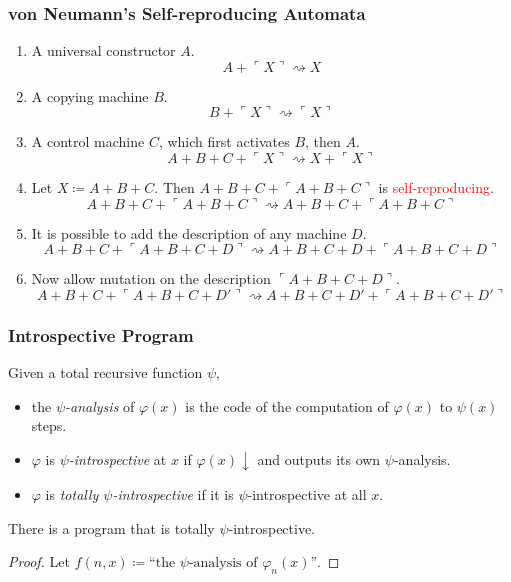 \documentclass[UTF8,11pt,colorlinks,compress,openany]{beamer}%
\begin{document}
\begin{frame}\frametitle{von Neumann's Self-reproducing Automata}
	\begin{enumerate}
		\item A universal constructor $A$.
		\[A+\ulcorner X\urcorner\rightsquigarrow X\]
		\item A copying machine $B$.
		\[B+\ulcorner X\urcorner\rightsquigarrow\ulcorner X\urcorner\]
		\item A control machine $C$, which first activates $B$, then $A$.
		\[A+B+C+\ulcorner X\urcorner\rightsquigarrow X+\ulcorner X\urcorner\]
		\item Let $X\coloneqq A+B+C$. {Then} $A+B+C+\ulcorner A+B+C\urcorner$ is \textcolor{red}{self-reproducing}.
		\[A+B+C+\ulcorner A+B+C\urcorner\rightsquigarrow A+B+C+\ulcorner A+B+C\urcorner\]
		\item It is possible to add the description of any machine $D$.
		\[A+B+C+\ulcorner A+B+C+D\urcorner\rightsquigarrow A+B+C+D+\ulcorner A+B+C+D\urcorner\]
		\item Now allow mutation on the description $\ulcorner A+B+C+D\urcorner$.
		\[A+B+C+\ulcorner A+B+C+D'\urcorner\rightsquigarrow A+B+C+D'+\ulcorner A+B+C+D'\urcorner\]
	\end{enumerate}
\end{frame}

\begin{frame}\frametitle{Introspective Program}
	\begin{definition}
		Given a total recursive function $\psi$,
		\begin{itemize}
			\item the \emph{$\psi$-analysis} of $\varphi(x)$ is the code of the computation of $\varphi(x)$ to $\psi(x)$ steps.
			\item $\varphi$ is \emph{$\psi$-introspective} at $x$ if $\varphi(x)\downarrow$ and outputs its own $\psi$-analysis.
			\item $\varphi$ is \emph{totally $\psi$-introspective} if it is $\psi$-introspective at all $x$. 
		\end{itemize}
	\end{definition}
	\begin{corollary}
		There is a program that is totally $\psi$-introspective.
	\end{corollary}
	\begin{proof}
		Let $f(n,x)\coloneqq \mbox{``the $\psi$-analysis of $\varphi_n(x)$''}$.
	\end{proof}
\end{frame}
\end{document}
